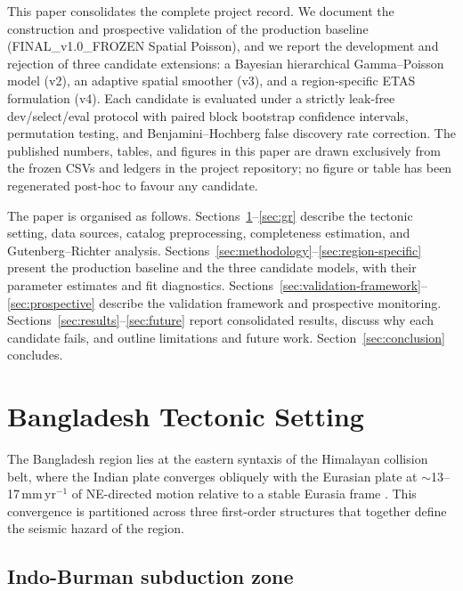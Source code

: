 \documentclass[10pt,a4paper,twocolumn]{article}
\begin{document}
This paper consolidates the complete project record. We document the construction and prospective validation of the production baseline (FINAL\_v1.0\_FROZEN Spatial Poisson), and we report the development and rejection of three candidate extensions: a Bayesian hierarchical Gamma--Poisson model (v2), an adaptive spatial smoother (v3), and a region-specific ETAS formulation (v4). Each candidate is evaluated under a strictly leak-free dev/select/eval protocol with paired block bootstrap confidence intervals, permutation testing, and Benjamini--Hochberg false discovery rate correction. The published numbers, tables, and figures in this paper are drawn exclusively from the frozen CSVs and ledgers in the project repository; no figure or table has been regenerated post-hoc to favour any candidate.

The paper is organised as follows. Sections~\ref{sec:tectonic}--\ref{sec:gr} describe the tectonic setting, data sources, catalog preprocessing, completeness estimation, and Gutenberg--Richter analysis. Sections~\ref{sec:methodology}--\ref{sec:region-specific} present the production baseline and the three candidate models, with their parameter estimates and fit diagnostics. Sections~\ref{sec:validation-framework}--\ref{sec:prospective} describe the validation framework and prospective monitoring. Sections~\ref{sec:results}--\ref{sec:future} report consolidated results, discuss why each candidate fails, and outline limitations and future work. Section~\ref{sec:conclusion} concludes.

\section{Bangladesh Tectonic Setting}\label{sec:tectonic}

The Bangladesh region lies at the eastern syntaxis of the Himalayan collision belt, where the Indian plate converges obliquely with the Eurasian plate at $\sim$13--17\,mm\,yr$^{-1}$ of NE-directed motion relative to a stable Eurasia frame \cite{steckler2008}. This convergence is partitioned across three first-order structures that together define the seismic hazard of the region.

\subsection{Indo-Burman subduction zone}
\end{document}
